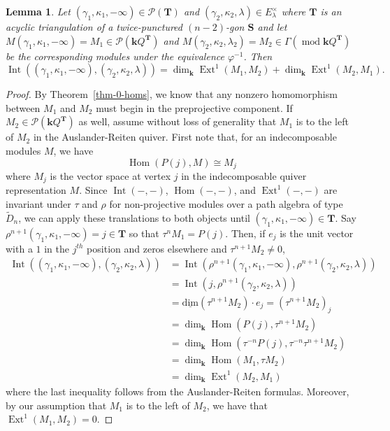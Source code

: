 \documentclass[10pt,a4paper]{amsart}
\newtheorem{lemma}{Lemma}
\newcommand{\Ext}{\operatorname{Ext}}
\newcommand{\Hom}{\operatorname{Hom}}
\newcommand{\Int}{\operatorname{Int}}
\def\TT{\mathbf{T}}
\renewcommand{\k}{\mathbf{k}}
\renewcommand{\mod}{\operatorname{mod}}
\def\surf{\mathbf{S}}                       %
\newcommand{\udim}{\operatorname{\underline{dim}}}
\begin{document}
\begin{lemma}
    Let $(\gamma_1, \kappa_1, -\infty) \in \mathcal{P}(\TT)$ and $(\gamma_2, \kappa_2, \lambda) \in E^\times_\lambda$ where $\TT$ is an acyclic triangulation of a twice-punctured $(n-2)$-gon $\surf$ and let $M(\gamma_1, \kappa_1, -\infty) = M_1 \in \mathcal{P}(\k Q^\TT)$ and $M(\gamma_2, \kappa_2, \lambda_2) = M_2 \in \Gamma(\mod \k Q^\TT)$ be the corresponding modules under the equivalence $\varphi^{-1}$.
    Then $$\Int( (\gamma_1,\kappa_1, -\infty), (\gamma_2,\kappa_2, \lambda) ) = \dim_\k \Ext^1 (M_1, M_2) + \dim_\k \Ext^1 (M_2, M_1).$$
\end{lemma}

\begin{proof}
    By Theorem~\ref{thm-0-homs}, we know that any nonzero homomorphism between $M_1$ and $M_2$ must begin in the preprojective component.
    If $M_2 \in \mathcal{P}(\k Q^\TT)$ as well, assume without loss of generality that $M_1$ is to the left of $M_2$ in the Auslander-Reiten quiver.
    First note that, for an indecomposable modules $M$, we have \[\Hom (P(j), M) \cong M_j\] where $M_j$ is the vector space at vertex $j$ in the indecomposable quiver representation $M$.
    Since $\Int( -, - )$, $\Hom(-,-)$, and $\Ext^1 (-, -)$ are invariant under $\tau$ and $\rho$ for non-projective modules over a path algebra of type $\widetilde{D}_n$, we can apply these translations to both objects until $(\gamma_1, \kappa_1, -\infty) \in \TT$.
    Say $\rho^{n+1} (\gamma_1,\kappa_1, -\infty) = j \in \TT$ so that $\tau^{n} M_1 = P(j)$.
    Then, if $e_j$ is the unit vector with a $1$ in the $j^{th}$ position and zeros elsewhere and $\tau^{n+1} M_2 \neq 0$,
    \begin{align*}
        \Int( (\gamma_1,\kappa_1, -\infty), (\gamma_2,\kappa_2, \lambda) ) &= \Int( \rho^{n+1}(\gamma_1,\kappa_1, -\infty), \rho^{n+1}(\gamma_2,\kappa_2, \lambda) ) \\
        &= \Int( j, \rho^{n+1}(\gamma_2,\kappa_2, \lambda) ) \\
        &= \udim (\tau^{n+1} M_2) \cdot e_j = (\tau^{n+1} M_2)_j \\
        &= \dim_\k \Hom (P(j), \tau^{n+1} M_2) \\
        &= \dim_\k \Hom (\tau^{-n}P(j), \tau^{-n}\tau^{n+1} M_2) \\
        &= \dim_\k \Hom (M_1, \tau M_2) \\
        &= \dim_\k \Ext^1 (M_2, M_1)
    \end{align*}
    where the last inequality follows from the Auslander-Reiten formulas.
    Moreover, by our assumption that $M_1$ is to the left of $M_2$, we have that $\Ext^1 (M_1, M_2) = 0$.
\end{proof}
\end{document}
